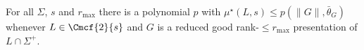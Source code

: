 \begin{conjecture}
\label{conj:rare-types}
For all $\Sigma$, $s$ and $r_{\max}$ there is a polynomial $p$ with
$\mu^\star(L,s)\le p(\|G\|,\bar\theta_G)$ whenever $L\in\Cmcf{2}{s}$ and
$G$ is a reduced good rank-$\le r_{\max}$ presentation of $L\cap\Sigma^+$.
\end{conjecture}



%
